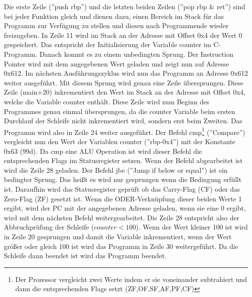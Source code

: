 \documentclass[12pt]{article}
\begin{document}
Die erste Zeile (''push rbp'') und die letzten beiden Zeilen (''pop rbp \& ret'') sind bei jeder Funktion gleich und dienen dazu, einen Bereich im Stack für das Programm zur Verfügung zu stellen und diesen nach Programmende wieder freizugeben. In Zeile 11 wird im Stack an der Adresse mit Offset 0x4 der Wert 0 gespeichert. Das entspricht der Initialisierung der Variable counter im C-Programm. Danach kommt es zu einem unbedingten Sprung. Der Instruction Pointer wird mit dem angegebenen Wert geladen und zeigt nun auf Adresse 0x612. Im nächsten Ausführungszyklus wird nun das Programm an Adresse 0x612 weiter ausgeführt. Mit diesem Sprung wird genau eine Zeile übersprungen. Diese Zeile (main+20) inkrementiert den Wert im Stack an der Adresse mit Offset 0x4, welche die Variable counter enthält. Diese Zeile wird zum Beginn des Programmes genau einmal übersprungen, da die counter Variable beim ersten Durchlauf der Schleife nicht inkrementiert wird, sondern erst beim Zweiten. Das Programm wird also in Zeile 24 weiter ausgeführt. Der Befehl cmp\footnote{Der Prozessor vergleicht zwei Werte indem er sie voneinander subtrahiert und dann die entsprechenden Flags setzt (ZF,OF,SF,AF,PF,CF)\cite[S.176]{intel4000}} (''Compare'') vergleicht nun den Wert der Variablen counter (''rbp-0x4'') mit der Konstante 0x63 (99d). Da cmp eine ALU Operation ist wird dieser Befehl die entsprechenden Flags im Statusregister setzen. Wenn der Befehl abgearbeitet ist wird die Zeile 28 geladen. Der Befehl jbe (''Jump if below or equal'') ist ein bedingter Sprung. Das heißt es wird nur gesprungen wenn die Bedingung erfüllt ist. Daraufhin wird das Statusregister geprüft ob das Carry-Flag (CF) oder das Zero-Flag (ZF) gesetzt ist. Wenn die ODER-Verknüpfung dieser beiden Werte 1 ergibt, wird der PC mit der angegebenen Adresse geladen, wenn sie eine 0 ergibt, wird mit dem nächsten Befehl weitergearbeitet\cite[S.1060]{intel4000}. Die Zeile 28 entspricht also der Abbruchprüfung der Schleife  ($counter < 100$). Wenn der Wert kleiner 100 ist wird in Zeile 20 gesprungen und damit die Variable inkrementiert, wenn der Wert größer oder gleich 100 ist wird das Programm in Zeile 30 weitergeführt. Da die Schleife dann beendet ist wird das Programm beendet.
\end{document}
